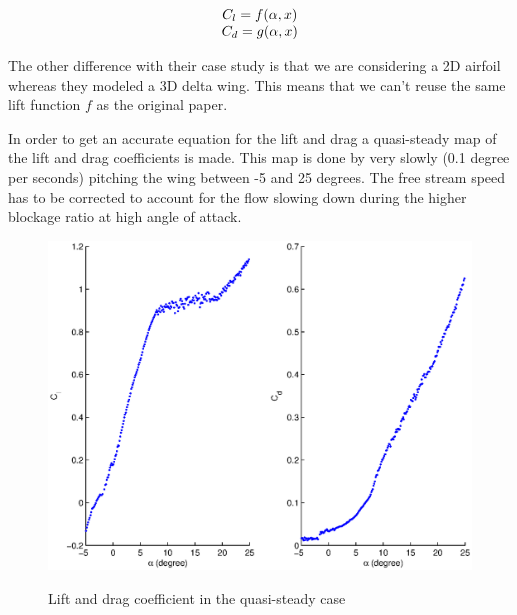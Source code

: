 \begin{equation}
  \begin{array}[c]{c}
    C_l=f(\alpha,x) \\
    C_d=g(\alpha,x)
  \end{array}
  \label{eqn:lift_drag_functions}
\end{equation}

\par The other difference with their case study is that we are considering a 2D airfoil whereas they modeled a 3D delta wing.
This means that we can't reuse the same lift function $f$ as the original paper.

\par In order to get an accurate equation for the lift and drag a quasi-steady map of the lift and drag coefficients is made.
This map is done by very slowly (0.1 degree per seconds) pitching the wing between -5 and 25 degrees.
The free stream speed has to be corrected to account for the flow slowing down during the higher blockage ratio at high angle of attack.

\begin{figure}[ht]
  \begin{center}
    \scalebox{0.8}
    {\includegraphics{./Figures/NACA0009_steady_map_Cl_Cd.eps}}
  \end{center}
  \caption{Lift and drag coefficient in the quasi-steady case}
  \label{fig:QS_Cl_Cd_vs_alpha}
\end{figure}

